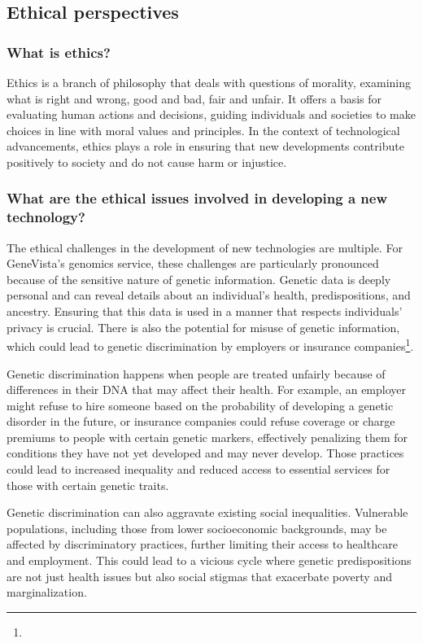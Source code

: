 \documentclass[a4paper]{article}
\begin{document}
\subsection{Ethical perspectives}

\subsubsection{What is ethics?}

Ethics is a branch of philosophy that deals with questions of morality, examining what is right and wrong, good and bad, fair and unfair. It offers a basis for evaluating human actions and decisions, guiding individuals and societies to make choices in line with moral values and principles. In the context of technological advancements, ethics plays a role in ensuring that new developments contribute positively to society and do not cause harm or injustice.

\subsubsection{What are the ethical issues involved in developing a new technology?}

The ethical challenges in the development of new technologies are multiple. For GeneVista's genomics service, these challenges are particularly pronounced because of the sensitive nature of genetic information. Genetic data is deeply personal and can reveal details about an individual’s health, predispositions, and ancestry. Ensuring that this data is used in a manner that respects individuals’ privacy is crucial. There is also the potential for misuse of genetic information, which could lead to genetic discrimination by employers or insurance companies\footnote{\discrimination}.

Genetic discrimination happens when people are treated unfairly because of differences in their DNA that may affect their health. For example, an employer might refuse to hire someone based on the probability of developing a genetic disorder in the future, or insurance companies could refuse coverage or charge premiums to people with certain genetic markers, effectively penalizing them for conditions they have not yet developed and may never develop. Those practices could lead to increased inequality and reduced access to essential services for those with certain genetic traits.

Genetic discrimination can also aggravate existing social inequalities. Vulnerable populations, including those from lower socioeconomic backgrounds, may be affected by discriminatory practices, further limiting their access to healthcare and employment. This could lead to a vicious cycle where genetic predispositions are not just health issues but also social stigmas that exacerbate poverty and marginalization.
\end{document}
